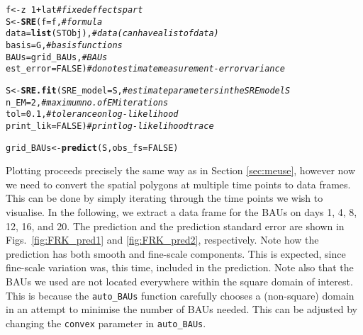\documentclass{article}\usepackage[]{graphicx}\usepackage[]{color}
\makeatletter
\newcommand{\hlnum}[1]{\textcolor[rgb]{0.686,0.059,0.569}{#1}}%
\newcommand{\hlcom}[1]{\textcolor[rgb]{0.678,0.584,0.686}{\textit{#1}}}%
\newcommand{\hlopt}[1]{\textcolor[rgb]{0,0,0}{#1}}%
\newcommand{\hlstd}[1]{\textcolor[rgb]{0.345,0.345,0.345}{#1}}%
\newcommand{\hlkwb}[1]{\textcolor[rgb]{0.69,0.353,0.396}{#1}}%
\newcommand{\hlkwc}[1]{\textcolor[rgb]{0.333,0.667,0.333}{#1}}%
\newcommand{\hlkwd}[1]{\textcolor[rgb]{0.737,0.353,0.396}{\textbf{#1}}}%
\newenvironment{kframe}{%
 \def\at@end@of@kframe{}%
 \ifinner\ifhmode%
  \def\at@end@of@kframe{\end{minipage}}%
  \begin{minipage}{\columnwidth}%
 \fi\fi%
 \def\FrameCommand##1{\hskip\@totalleftmargin \hskip-\fboxsep
 \colorbox{shadecolor}{##1}\hskip-\fboxsep
     \hskip-\linewidth \hskip-\@totalleftmargin \hskip\columnwidth}%
 \MakeFramed {\advance\hsize-\width
   \@totalleftmargin\z@ \linewidth\hsize
   \@setminipage}}%
 {\par\unskip\endMakeFramed%
 \at@end@of@kframe}
\newenvironment{knitrout}{}{} %
\renewcommand{\tt} {\texttt}
\makeatother
\begin{document}
\begin{knitrout}
\color{fgcolor}\begin{kframe}
\begin{alltt}
 \hlstd{f} \hlkwb{<-} \hlstd{z} \hlopt{~} \hlnum{1} \hlopt{+} \hlstd{lat}                 \hlcom{# fixed effects part}
 \hlstd{S} \hlkwb{<-} \hlkwd{SRE}\hlstd{(}\hlkwc{f} \hlstd{= f,}                  \hlcom{# formula}
          \hlkwc{data} \hlstd{=} \hlkwd{list}\hlstd{(STObj),}     \hlcom{# data (can have a list of data)}
          \hlkwc{basis} \hlstd{= G,}              \hlcom{# basis functions}
          \hlkwc{BAUs} \hlstd{= grid_BAUs,}       \hlcom{# BAUs}
          \hlkwc{est_error} \hlstd{=} \hlnum{FALSE}\hlstd{)}      \hlcom{# do not estimate measurement-error variance}

 \hlstd{S} \hlkwb{<-} \hlkwd{SRE.fit}\hlstd{(}\hlkwc{SRE_model} \hlstd{= S,}    \hlcom{# estimate parameters in the SRE model S}
             \hlkwc{n_EM} \hlstd{=} \hlnum{2}\hlstd{,}          \hlcom{# maximum no. of EM iterations}
             \hlkwc{tol} \hlstd{=} \hlnum{0.1}\hlstd{,}         \hlcom{# tolerance on log-likelihood}
             \hlkwc{print_lik}\hlstd{=}\hlnum{FALSE}\hlstd{)}   \hlcom{# print log-likelihood trace}

 \hlstd{grid_BAUs} \hlkwb{<-} \hlkwd{predict}\hlstd{(S,} \hlkwc{obs_fs} \hlstd{=} \hlnum{FALSE}\hlstd{)}
\end{alltt}
\end{kframe}
\end{knitrout}

Plotting proceeds precisely the same way as in Section \ref{sec:meuse}, however now we need to convert the spatial polygons at multiple time points to data frames. This can be done by simply iterating through the time points we wish to visualise. In the following, we extract a data frame for the BAUs on days 1, 4, 8, 12, 16, and 20. The prediction and the prediction standard error are shown in Figs.~\ref{fig:FRK_pred1} and \ref{fig:FRK_pred2}, respectively. Note how the prediction has both smooth and fine-scale components. This is expected, since fine-scale variation was, this time, included in the prediction. Note also that the BAUs we used are not located everywhere within the square domain of interest. This is because the \tt{auto\_BAUs} function carefully chooses a (non-square) domain in an attempt to minimise the number of BAUs needed. This can be adjusted by changing the \tt{convex} parameter in \tt{auto\_BAUs}.
\end{document}
